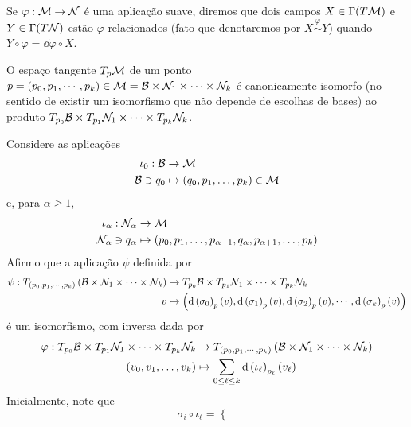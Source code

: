 \begin{deff}
Se $\varphi: \mathcal{M} \to \mathcal{N}$ é uma aplicação suave, diremos que dois campos $X \in \Gamma(T \mathcal{M})$ e $Y \in \Gamma(T \mathcal{N})$ estão $\varphi$-relacionados (fato que denotaremos por $X \overset{\varphi}{\sim} Y$) quando $Y \circ \varphi = \dd \varphi \circ X$.
\end{deff}


\begin{lema}
O espaço tangente $T_p \mathcal{M}$ de um ponto $p = (p_0, p_1, \cdots, p_k) \in \mathcal{M} = \mathcal{B} \times \mathcal{N}_1 \times \cdots \times \mathcal{N}_k$ é canonicamente isomorfo (no sentido de existir um isomorfismo que não depende de escolhas de bases) ao produto $T_{p_0} \mathcal{B} \times T_{p_1} \mathcal{N}_1 \times \cdots \times T_{p_k} \mathcal{N}_k$. 
\end{lema}

\begin{demm}
Considere as aplicações
\begin{align*}
\iota_0 : \mathcal{B} &\to \mathcal{M} \\
\mathcal{B} \ni q_0 &\mapsto \left( q_0, p_1, \ldots, p_k \right) \in \mathcal{M}
\end{align*}
e, para $\alpha \geq 1$,
\begin{align*}
\iota_{\alpha}: \mathcal{N}_{\alpha} &\to \mathcal{M} \\
\mathcal{N}_{\alpha} \ni q_{\alpha} &\mapsto \left(  p_0, p_1, \ldots, p_{\alpha - 1}, q_{\alpha}, p_{\alpha + 1}, \ldots, p_k \right)
\end{align*}
Afirmo que a aplicação $\psi$ definida por
\begin{align*}
\psi: T_{(p_0, p_1, \cdots, p_k)} \left( \mathcal{B} \times \mathcal{N}_1 \times \cdots \times \mathcal{N}_k \right)&\to T_{p_0} \mathcal{B} \times T_{p_1} \mathcal{N}_1 \times \cdots \times T_{p_k} \mathcal{N}_k  \\
v &\mapsto \left( \mathrm{d} \left( \sigma_0 \right)_{p}(v), \mathrm{d} \left( \sigma_1 \right)_{p}(v),  \mathrm{d} \left( \sigma_2 \right)_{p}(v), \cdots, \mathrm{d} \left( \sigma_k \right)_{p}(v) \right)
\end{align*}
é um isomorfismo, com inversa dada por
\begin{align*}
\varphi: T_{p_0} \mathcal{B} \times T_{p_1} \mathcal{N}_1 \times \cdots \times T_{p_k} \mathcal{N}_k &\to  T_{(p_0, p_1, \cdots, p_k)} \left( \mathcal{B} \times \mathcal{N}_1 \times \cdots \times \mathcal{N}_k  \right)\\
\left( v_0, v_1, \ldots, v_k \right) &\mapsto \sum_{0 \leq \ell \leq k}\mathrm{d} \left( \iota_{\ell} \right)_{p_{\ell}}\left( v_{\ell} \right)
\end{align*}  
Inicialmente, note que
\[
\sigma_i \circ \iota_{\ell} = \begin{cases}

\end{cases}\]
\end{demm}
